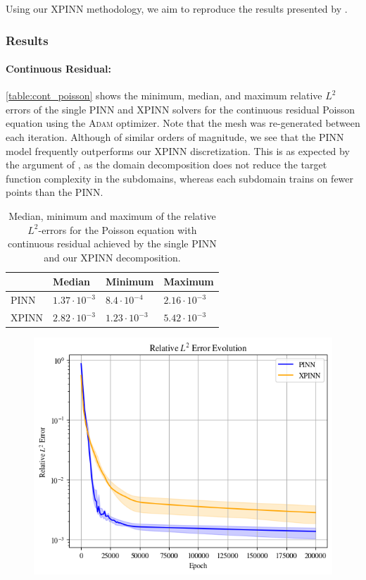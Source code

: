 Using our XPINN methodology, we aim to reproduce the results presented by \textcite{XPINN_generalize}.

\subsubsection{Results}
\paragraph{Continuous Residual:}
\autoref{table:cont_poisson} shows the minimum, median, and maximum relative $L^2$ errors of the single PINN and XPINN solvers for the continuous residual Poisson equation using the \textsc{Adam} optimizer. Note that the mesh was re-generated between each iteration. Although of similar orders of magnitude, we see that the PINN model frequently outperforms our XPINN discretization. This is as expected by the argument of \textcite{XPINN_generalize}, as the domain decomposition does not reduce the target function
complexity in the subdomains, whereas each subdomain trains on fewer points than the PINN. 

\begin{table}[h]
\caption{Median, minimum and maximum of the relative $L^2$-errors for the Poisson equation with continuous residual achieved by the single PINN and our XPINN decomposition. }
    \centering
    \begin{tabular}{|l|l l l|}
    \hline
     & Median & Minimum & Maximum
    \\
    \hline
    PINN &$1.37\cdot 10^{-3}$ &  $8.4 \cdot 10^{-4}$&$2.16 \cdot 10^{-3}$ 
    \\
    XPINN &$2.82\cdot 10^{-3}$ &  $1.23 \cdot 10^{-3}$&$5.42 \cdot 10^{-3}$
    \\
    \hline
    \end{tabular}
    \label{table:cont_poisson}
\end{table}
\begin{figure}[h]
    \centering
    \includegraphics[width = \linewidth]{Project1XPINNs/figures/Poisson/Relative_L2_smooth_Adam.png}
    \caption{}
    \label{fig:rel_l2_smooth_poisson}
\end{figure}

